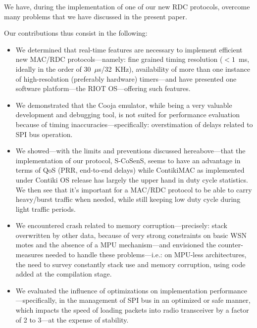 \documentclass[12pt,a4paper]{article}
\begin{document}
We have, during the implementation of one of our new RDC protocols, overcome
many problems that we have discussed in the present paper.

Our contributions thus consist in the following:

\begin{itemize}

\item We determined that real-time features are necessary to implement
      efficient new MAC/RDC protocols---namely: fine grained timing
      resolution ($<1$~ms, ideally in the order of 30~$\mu$s/32~KHz),
      availability of more than one instance of high-resolution (preferably
      hardware) timers---and have presented one software platform---the RIOT
      OS---offering such features.

\item We demonstrated that the Cooja emulator, while being a very valuable
      development and debugging tool, is not suited for performance
      evaluation because of timing inaccuracies---specifically: overstimation
      of delays related to SPI bus operation.

\item We showed---with the limits and preventions discussed hereabove---that
      the implementation of our protocol, S-CoSenS, seems to have an
      advantage in terms of QoS (PRR, end-to-end delays) while ContikiMAC
      as implemented under Contiki OS release has largely the upper hand
      in duty cycle statistics. We then see that it's important for a MAC/RDC
      protocol to be able to carry heavy/burst traffic when needed, while
      still keeping low duty cycle during light traffic periods.

\item We encountered crash related to memory corruption---precisely: stack
      overwritten by other data, because of very strong constraints on basic
      WSN motes and the absence of a MPU mechanism---and envisioned the
      counter-measures needed to handle these problems---i.e.: on MPU-less
      architectures, the need to survey constantly stack use and memory
      corruption, using code added at the compilation stage.

\item We evaluated the influence of optimizations on implementation
      perfor\-mance---specifically, in the management of SPI bus in an
      optimized or safe manner, which impacts the speed of loading packets
      into radio transceiver by a factor of 2 to 3---at the expense of
      stability.

\end{itemize}
\end{document}
